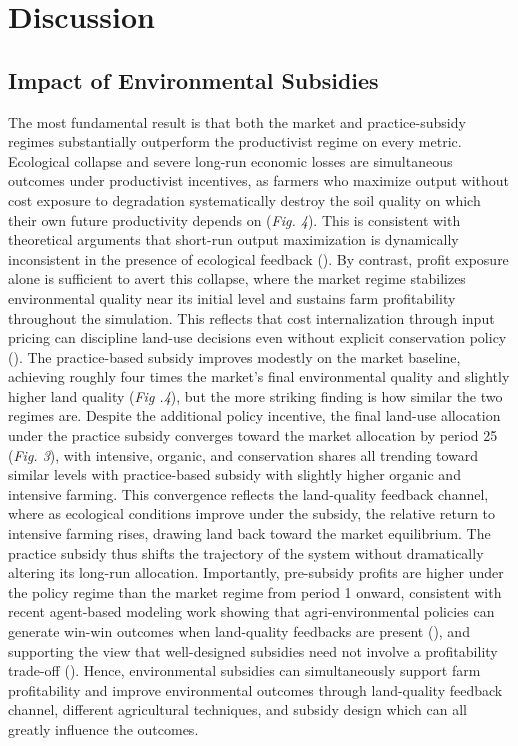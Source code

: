\documentclass{article}
\begin{document}
\section{Discussion}

\subsection{Impact of Environmental Subsidies}
The most fundamental result is that both the market and practice-subsidy regimes substantially outperform the productivist regime on every metric. Ecological collapse and severe long-run economic losses are simultaneous outcomes under productivist incentives, as farmers who maximize output without cost exposure to degradation systematically destroy the soil quality on which their own future productivity depends on (\textit{Fig. 4}). This is consistent with theoretical arguments that short-run output maximization is dynamically inconsistent in the presence of ecological feedback (\cite{foley2005consequence}). By contrast, profit exposure alone is sufficient to avert this collapse, where the market regime stabilizes environmental quality near its initial level and sustains farm profitability throughout the simulation. This reflects that cost internalization through input pricing can discipline land-use decisions even without explicit conservation policy (\cite{yang2025rice, zheng2026price}). The practice-based subsidy improves modestly on the market baseline, achieving roughly four times the market's final environmental quality and slightly higher land quality (\textit{Fig .4}), but the more striking finding is how similar the two regimes are. Despite the additional policy incentive, the final land-use allocation under the practice subsidy converges toward the market allocation by period 25 (\textit{Fig. 3}), with intensive, organic, and conservation shares all trending toward similar levels with practice-based subsidy with slightly higher organic and intensive farming. This convergence reflects the land-quality feedback channel, where as ecological conditions improve under the subsidy, the relative return to intensive farming rises, drawing land back toward the market equilibrium. The practice subsidy thus shifts the trajectory of the system without dramatically altering its long-run allocation. Importantly, pre-subsidy profits are higher under the policy regime than the market regime from period 1 onward, consistent with recent agent-based modeling work showing that agri-environmental policies can generate win-win outcomes when land-quality feedbacks are present (\cite{coronese2023agrilove, baldi2025cap, bayram2024luxembourg}), and supporting the view that well-designed subsidies need not involve a profitability trade-off (\cite{tanentzap2015conflict, power2010ecosystem}). Hence, environmental subsidies can simultaneously support farm profitability and improve environmental outcomes through land-quality feedback channel, different agricultural techniques, and subsidy design which can all greatly influence the outcomes. 
\end{document}
